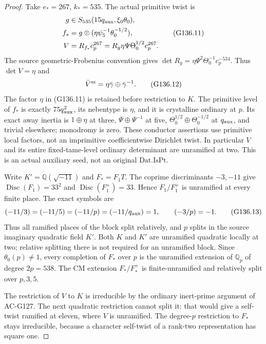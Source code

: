 \begin{proof}
Take \(e_*=267\), \(k_*=535\).  The actual primitive twist is
\[
 \begin{split}
 g&\in S_{535}(15q_{\rm aux},\xi_0\theta_0),\\
 f_*&=g\otimes(\eta\psi_5^{-1}\theta_0^{-1/2}),\\
 V&=R_{f_*}c_p^{267}
    =R_g\eta\Psi\Theta_0^{1/2}c_p^{267}.
 \end{split}
 \tag{G136.11}
\]
The source geometric-Frobenius convention gives
\(\det R_g=\eta\Psi^2\Theta_0^{-1}c_p^{-534}\).
Thus \(\det V=\eta\) and
\[
 \bar V^{\rm ss}=\eta\bar\gamma\oplus\bar\gamma^{-1}.
 \tag{G136.12}
\]
The factor \(\eta\) in (G136.11) is retained before restriction
to \(K\).  The primitive level of \(f_*\) is exactly
\(75q_{\rm aux}^2\), its nebentype is \(\eta\), and it is
crystalline ordinary at \(p\).  Its exact away inertia is
\(1\oplus\eta\) at three, \(\Psi\oplus\Psi^{-1}\) at five,
\(\Theta_0^{1/2}\oplus\Theta_0^{-1/2}\) at \(q_{\rm aux}\),
and trivial elsewhere; monodromy is zero.  These conductor
assertions use primitive local factors, not an imprimitive
coefficientwise Dirichlet twist.  In particular \(V\) and its
entire fixed-tame-level ordinary determinant are unramified at two.
This is an actual auxiliary seed, not an original
\(\mathrm{Dat.IsPt}\).

Write \(K'=\mathbb Q(\sqrt{-11})\) and \(F_*=F_1T\).
The coprime discriminants \(-3,-11\) give
\(\operatorname{Disc}(F_1)=33^2\) and
\(\operatorname{Disc}(F_1^+)=33\).  Hence \(F_1/F_1^+\)
is unramified at every finite place.
The exact symbols are
\[
 (-11/3)=(-11/5)=(-11/p)=(-11/q_{\rm aux})=1,
 \qquad (-3/p)=-1.
 \tag{G136.13}
\]
Thus all ramified places of the block split relatively, and
\(p\) splits in the source imaginary quadratic field \(K'\).
Both \(K\) and \(K'\) are unramified quadratic locally at two;
relative splitting there is not required for an unramified block.
Since \(\theta_0(p)\ne1\), every completion of \(F_*\) over
\(p\) is the unramified extension of \(\mathbb Q_p\) of
degree \(2p=538\).  The CM extension \(F_*/F_*^+\) is
finite-unramified and relatively split over \(p,3,5\).

The restriction of \(V\) to \(K\) is irreducible by the
ordinary inert-prime argument of AC-G127.  The next quadratic
restriction cannot split it: that would give a self-twist
ramified at eleven, where \(V\) is unramified.  The degree-\(p\)
restriction to \(F_*\) stays irreducible, because a character
self-twist of a rank-two representation has square one.


\end{proof}
